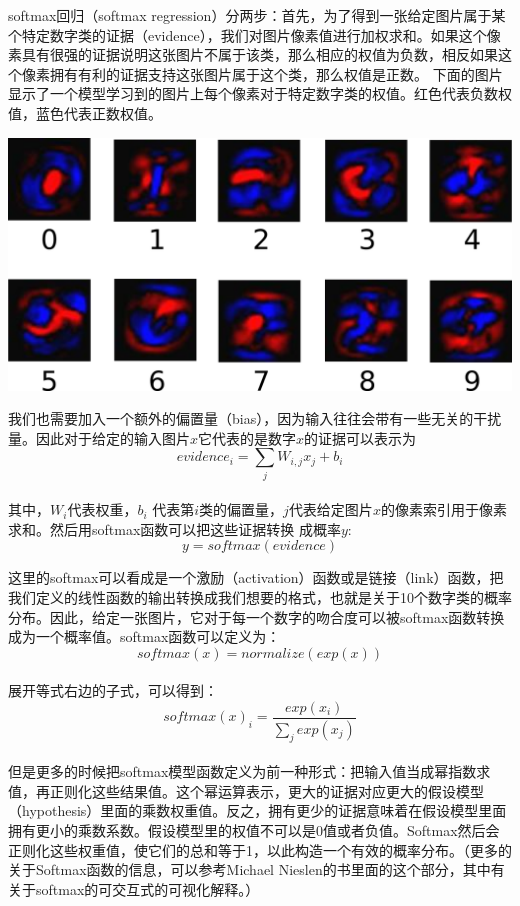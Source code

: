 softmax回归（softmax regression）分两步：首先，为了得到一张给定图片属于某个特定数字类的证据（evidence），我们对图片像素值进行加权求和。如果这个像素具有很强的证据说明这张图片不属于该类，那么相应的权值为负数，相反如果这个像素拥有有利的证据支持这张图片属于这个类，那么权值是正数。
下面的图片显示了一个模型学习到的图片上每个像素对于特定数字类的权值。红色代表负数权值，蓝色代表正数权值。


\begin{center}
\includegraphics[width=.7\textwidth]{../SOURCE/images/softmax-weights.png}
\end{center}

我们也需要加入一个额外的偏置量（bias），因为输入往往会带有一些无关的干扰量。因此对于给定的输入图片$x$它代表的是数字$x$的证据可以表示为\\
\begin{equation}
evidence_i = \sum_j{W_{i,j}}x_j+b_i
\end{equation}\\
其中，$W_i$代表权重，$b_i$ 代表第$i$类的偏置量，$j$代表给定图片$x$的像素索引用于像素求和。然后用softmax函数可以把这些证据转换
成概率$y$:\\
\begin{equation}
y = softmax(evidence)
\end{equation}

这里的softmax可以看成是一个激励（activation）函数或是链接（link）函数，把我们定义的线性函数的输出转换成我们想要的格式，也就是关于10个数字类的概率分布。因此，给定一张图片，它对于每一个数字的吻合度可以被softmax函数转换成为一个概率值。softmax函数可以定义为：\\
\begin{equation}
softmax(x) = normalize(exp(x))
\end{equation}\\
展开等式右边的子式，可以得到：\\
\begin{equation}
softmax(x)_i = \frac{exp(x_i)}{\sum_j{exp(x_j)}}
\end{equation}\\
但是更多的时候把softmax模型函数定义为前一种形式：把输入值当成幂指数求值，再正则化这些结果值。这个幂运算表示，更大的证据对应更大的假设模型（hypothesis）里面的乘数权重值。反之，拥有更少的证据意味着在假设模型里面拥有更小的乘数系数。假设模型里的权值不可以是0值或者负值。Softmax然后会正则化这些权重值，使它们的总和等于1，以此构造一个有效的概率分布。（更多的关于Softmax函数的信息，可以参考Michael Nieslen的书里面的这个部分，其中有关于softmax的可交互式的可视化解释。）


